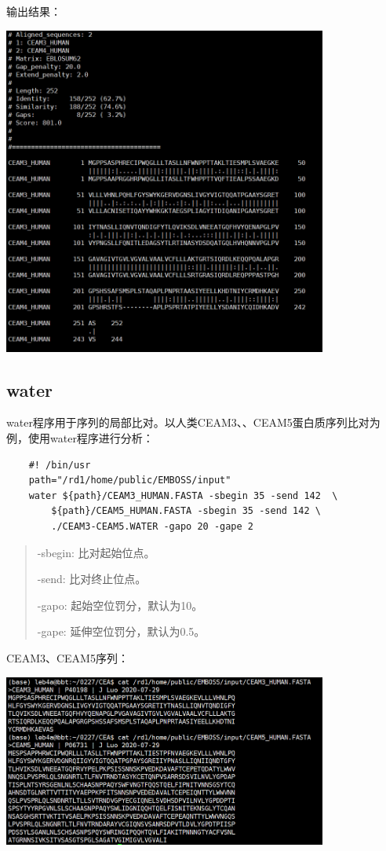 输出结果：

\includegraphics[width=0.8\textwidth]{./image/gdk/5.2.2.png}

\subsection{water}

water程序用于序列的局部比对。以人类CEAM3、、CEAM5蛋白质序列比对为例，使用water程序进行分析：

\begin{lstlisting}
    #! /bin/usr
    path="/rd1/home/public/EMBOSS/input"
    water ${path}/CEAM3_HUMAN.FASTA -sbegin 35 -send 142  \
	    ${path}/CEAM5_HUMAN.FASTA -sbegin 35 -send 142 \
	    ./CEAM3-CEAM5.WATER -gapo 20 -gape 2
\end{lstlisting}

\begin{quotation}
    -sbegin: 比对起始位点。

    -send: 比对终止位点。

    -gapo: 起始空位罚分，默认为10。

    -gape: 延伸空位罚分，默认为0.5。
\end{quotation}

CEAM3、CEAM5序列：

\includegraphics[width=0.8\textwidth]{./image/gdk/5.2.3.png}


